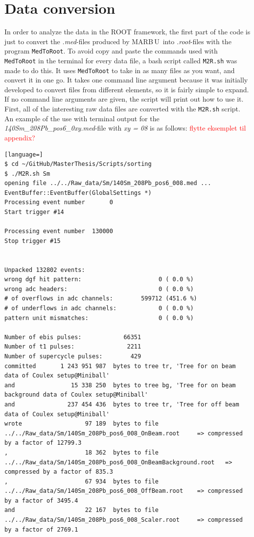 \documentclass[twoside,english]{uiofysmaster/uiofysmaster}
\newcommand{\MBOU}{MAR\belowbaseline[-2pt]{a}B\stackinset{l}{3pt}{b}{-3pt}{O}{O}\,U}
\begin{document}
\section{Data conversion}\label{sec:data_conversion}
In order to analyze the data in the ROOT framework, the first part of the code is just to convert the \textit{.med}-files produced by \MBOU\ into \textit{.root}-files with the program \texttt{MedToRoot}. 
To avoid copy and paste the commands used with \texttt{MedToRoot} in the terminal for every data file, a bash script called \texttt{M2R.sh} was made to do this. 
It uses \texttt{MedToRoot} to take in as many files as you want, and convert it in one go. 
It takes one command line argument because it was initially developed to convert files from different elements, so it is fairly simple to expand. 
If no command line arguments are given, the script will print out how to use it.
First, all of the interesting raw data files are converted with the \texttt{M2R.sh} script. 
An example of the use with terminal output for the \textit{140Sm\_208Pb\_pos6\_0xy.med}-file with \textit{xy = 08} is as follows: \textcolor{red}{flytte eksemplet til appendix?}

\begin{lstlisting}[language=]
$ cd ~/GitHub/MasterThesis/Scripts/sorting
$ ./M2R.sh Sm
opening file ../../Raw_data/Sm/140Sm_208Pb_pos6_008.med ...
EventBuffer::EventBuffer(GlobalSettings *)
Processing event number       0
Start trigger #14

Processing event number  130000
Stop trigger #15


Unpacked 132802 events:
wrong dgf hit pattern:                      0 ( 0.0 %)
wrong adc headers:                          0 ( 0.0 %)
# of overflows in adc channels:        599712 (451.6 %)
# of underflows in adc channels:            0 ( 0.0 %)
pattern unit mismatches:                    0 ( 0.0 %)

Number of ebis pulses:            66351
Number of t1 pulses:               2211
Number of supercycle pulses:        429
committed       1 243 951 987  bytes to tree tr, 'Tree for on beam data of Coulex setup@Miniball'
and                15 338 250  bytes to tree bg, 'Tree for on beam background data of Coulex setup@Miniball'
and               237 454 436  bytes to tree tr, 'Tree for off beam data of Coulex setup@Miniball'
wrote                  97 189  bytes to file ../../Raw_data/Sm/140Sm_208Pb_pos6_008_OnBeam.root 	=> compressed by a factor of 12799.3
,                      18 362  bytes to file ../../Raw_data/Sm/140Sm_208Pb_pos6_008_OnBeamBackground.root 	=> compressed by a factor of 835.3
,                      67 934  bytes to file ../../Raw_data/Sm/140Sm_208Pb_pos6_008_OffBeam.root 	=> compressed by a factor of 3495.4
and                    22 167  bytes to file ../../Raw_data/Sm/140Sm_208Pb_pos6_008_Scaler.root 	=> compressed by a factor of 2769.1
\end{lstlisting}
\end{document}
